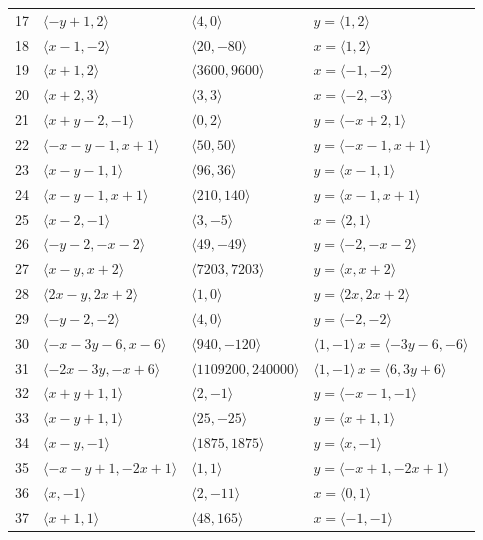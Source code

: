 \documentclass[11pt]{article}
\begin{document}
\begin{longtable}{@{}rlll@{}}
17 & $\langle -y+1,2\rangle$ & $\langle 4,0\rangle$ & $y=\langle 1,2\rangle$\\
18 & $\langle x-1,-2\rangle$ & $\langle 20,-80\rangle$ & $x=\langle 1,2\rangle$\\
19 & $\langle x+1,2\rangle$ & $\langle 3600,9600\rangle$ & $x=\langle -1,-2\rangle$\\
20 & $\langle x+2,3\rangle$ & $\langle 3,3\rangle$ & $x=\langle -2,-3\rangle$\\
21 & $\langle x+y-2,-1\rangle$ & $\langle 0,2\rangle$ & $y=\langle -x+2,1\rangle$\\
22 & $\langle -x-y-1,x+1\rangle$ & $\langle 50,50\rangle$ & $y=\langle -x-1,x+1\rangle$\\
23 & $\langle x-y-1,1\rangle$ & $\langle 96,36\rangle$ & $y=\langle x-1,1\rangle$\\
24 & $\langle x-y-1,x+1\rangle$ & $\langle 210,140\rangle$ & $y=\langle x-1,x+1\rangle$\\
25 & $\langle x-2,-1\rangle$ & $\langle 3,-5\rangle$ & $x=\langle 2,1\rangle$\\
26 & $\langle -y-2,-x-2\rangle$ & $\langle 49,-49\rangle$ & $y=\langle -2,-x-2\rangle$\\
27 & $\langle x-y,x+2\rangle$ & $\langle 7203,7203\rangle$ & $y=\langle x,x+2\rangle$\\
28 & $\langle 2x-y,2x+2\rangle$ & $\langle 1,0\rangle$ & $y=\langle 2x,2x+2\rangle$\\
29 & $\langle -y-2,-2\rangle$ & $\langle 4,0\rangle$ & $y=\langle -2,-2\rangle$\\
30 & $\langle -x-3y-6,x-6\rangle$ & $\langle 940,-120\rangle$ & $\langle 1,-1\rangle\,x=\langle -3y-6,-6\rangle$\\
31 & $\langle -2x-3y,-x+6\rangle$ & $\langle 1109200,240000\rangle$ & $\langle 1,-1\rangle\,x=\langle 6,3y+6\rangle$\\
32 & $\langle x+y+1,1\rangle$ & $\langle 2,-1\rangle$ & $y=\langle -x-1,-1\rangle$\\
33 & $\langle x-y+1,1\rangle$ & $\langle 25,-25\rangle$ & $y=\langle x+1,1\rangle$\\
34 & $\langle x-y,-1\rangle$ & $\langle 1875,1875\rangle$ & $y=\langle x,-1\rangle$\\
35 & $\langle -x-y+1,-2x+1\rangle$ & $\langle 1,1\rangle$ & $y=\langle -x+1,-2x+1\rangle$\\
36 & $\langle x,-1\rangle$ & $\langle 2,-11\rangle$ & $x=\langle 0,1\rangle$\\
37 & $\langle x+1,1\rangle$ & $\langle 48,165\rangle$ & $x=\langle -1,-1\rangle$\\

\end{longtable}
\end{document}
